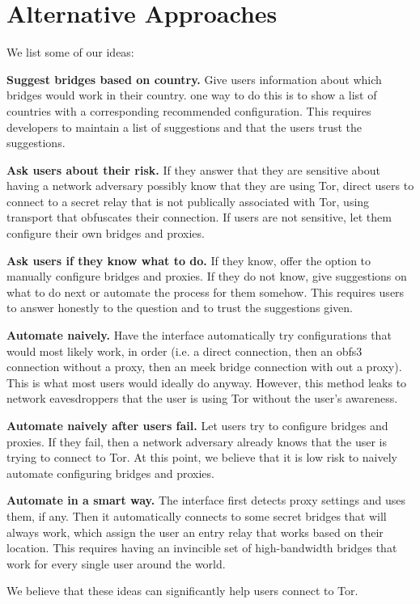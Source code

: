 \documentclass[USenglish,oneside,twocolumn]{article}
\begin{document}
\section{Alternative Approaches} 
\label{alternatives}
We list some of our ideas:\\
\begin{description}
\item{\bfseries Suggest bridges based on country.} Give users information about which bridges would work in their country. one way to do this is to show a list of countries with a corresponding recommended configuration. This requires developers to maintain a list of suggestions and that the users trust the suggestions. 
\item{\bfseries Ask users about their risk.} If they answer that they are sensitive about having a network adversary possibly know that they are using Tor, direct users to connect to a secret relay that is not publically associated with Tor, using transport that obfuscates their connection. If users are not sensitive, let them configure their own bridges and proxies. 
\item{\bfseries Ask users if they know what to do.} If they know, offer the option to manually configure bridges and proxies. If they do not know, give suggestions on what to do next or automate the process for them somehow. This requires users to answer honestly to the question and to trust the suggestions given. 
\item{\bfseries Automate naively.} Have the interface automatically try configurations that would most likely work, in order (i.e. a direct connection, then an obfs3 connection without a proxy, then an meek bridge connection with out a proxy). This is what most users would ideally do anyway. However, this method leaks to network eavesdroppers that the user is using Tor without the user's awareness. 
\item {\bfseries Automate naively after users fail.} Let users try to configure bridges and proxies. If they fail, then a network adversary already knows that the user is trying to connect to Tor. At this point, we believe that it is low risk to naively automate configuring bridges and proxies. 
\item{\bfseries Automate in a smart way.} The interface first detects proxy settings and uses them, if any. Then it automatically connects to some secret bridges that will always work, which assign the user an entry relay that works based on their location. This requires having an invincible set of high-bandwidth bridges that work for every single user around the world.  
\end{description}

We believe that these ideas can significantly help users connect to Tor. 
\end{document}
